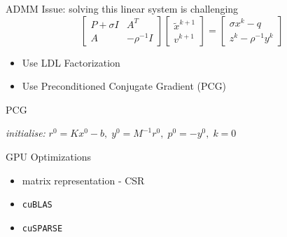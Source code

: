 \documentclass[10pt]{beamer}
\begin{document}
\begin{frame}[fragile]{ADMM}
Issue: solving this linear system is challenging
\begin{equation}
\begin{bmatrix}
P+\sigma I & A^T\\
A & -\rho^{-1}I  
\end{bmatrix}
\begin{bmatrix}
\tilde{x}^{k+1}\\
v^{k+1}
\end{bmatrix}
= \begin{bmatrix}
\sigma x^k - q\\
z^k - \rho^{-1}y^k
\end{bmatrix}
\end{equation}
\begin{itemize}
\item Use LDL Factorization
\item Use Preconditioned Conjugate Gradient (PCG)
\end{itemize}
\end{frame}


\begin{frame}[fragile]{PCG}

\begin{algorithm}[H]
\SetAlgoLined
\textit{initialise:}
 $r^0 = Kx^0 -b, \; y^0 = M^{-1}r^0, \; p^0 = -y^0, \; k = 0 $
 \\  \caption{PCG algorithm as presented in \cite{cuosqp}}
\end{algorithm}


\end{frame}

\begin{frame}[fragile]{GPU Optimizations}
\begin{itemize}
\item matrix representation - CSR
\item \texttt{cuBLAS}
\item \texttt{cuSPARSE}
\end{itemize}
\end{frame}
\end{document}
